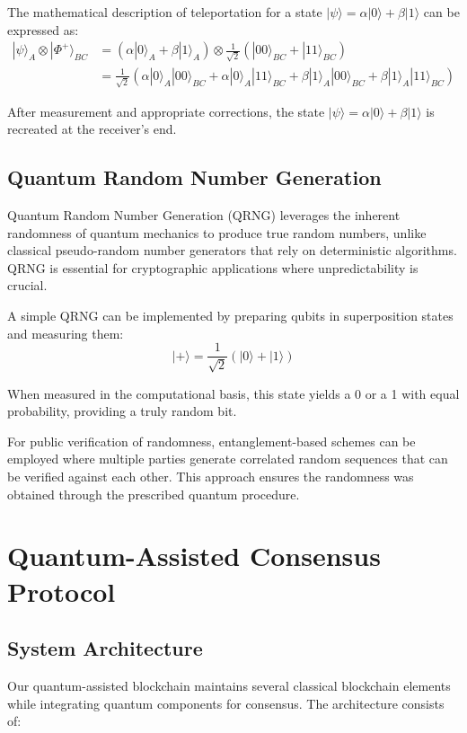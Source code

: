 \documentclass[11pt,a4paper]{article}
\begin{document}
The mathematical description of teleportation for a state $|\psi\rangle = \alpha|0\rangle + \beta|1\rangle$ can be expressed as:
\begin{align}
|\psi\rangle_A \otimes |\Phi^+\rangle_{BC} &= (\alpha|0\rangle_A + \beta|1\rangle_A) \otimes \frac{1}{\sqrt{2}}(|00\rangle_{BC} + |11\rangle_{BC}) \\
&= \frac{1}{\sqrt{2}}(\alpha|0\rangle_A |00\rangle_{BC} + \alpha|0\rangle_A |11\rangle_{BC} + \beta|1\rangle_A |00\rangle_{BC} + \beta|1\rangle_A |11\rangle_{BC})
\end{align}

After measurement and appropriate corrections, the state $|\psi\rangle = \alpha|0\rangle + \beta|1\rangle$ is recreated at the receiver's end.

\subsection{Quantum Random Number Generation}
Quantum Random Number Generation (QRNG) leverages the inherent randomness of quantum mechanics to produce true random numbers, unlike classical pseudo-random number generators that rely on deterministic algorithms. QRNG is essential for cryptographic applications where unpredictability is crucial.

A simple QRNG can be implemented by preparing qubits in superposition states and measuring them:
\begin{equation}
|+\rangle = \frac{1}{\sqrt{2}}(|0\rangle + |1\rangle)
\end{equation}

When measured in the computational basis, this state yields a 0 or a 1 with equal probability, providing a truly random bit.

For public verification of randomness, entanglement-based schemes can be employed where multiple parties generate correlated random sequences that can be verified against each other. This approach ensures the randomness was obtained through the prescribed quantum procedure.

\section{Quantum-Assisted Consensus Protocol}

\subsection{System Architecture}
Our quantum-assisted blockchain maintains several classical blockchain elements while integrating quantum components for consensus. The architecture consists of:
\end{document}
